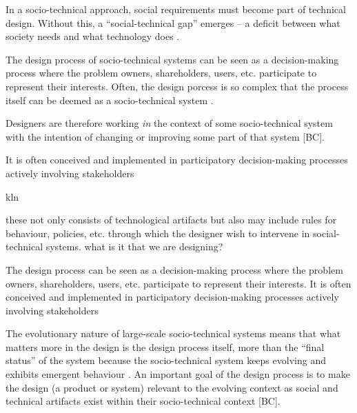 \begin{svgraybox}

In a socio-technical approach, social requirements must become part of technical design. Without this, a ``social-technical  gap''  emerges -- a  deficit  between  what  society  needs  and  what technology does \cite{Whitworth2014}. 



 The design process of socio-technical systems can be seen as a decision-making process where the problem owners, shareholders, users, etc. participate to represent their interests. Often, the design porcess is so complex that the process itself can be deemed as a socio-technical system \cite{Baxter2011}. 



Designers are therefore working \textit{in} the context of some socio-technical system with the intention of changing or improving some part of that system [BC]. 

It is often conceived and implemented in participatory decision-making processes actively involving stakeholders

kln





 these not only consists of technological artifacts but also may include rules for behaviour, policies, etc. through which the designer wish to intervene in social-technical systems. what is it that we are designing? 

 The design process can be seen as a decision-making process where the problem owners, shareholders, users, etc. participate to represent their interests. It is often conceived and implemented in participatory decision-making processes actively involving stakeholders



The evolutionary nature of large-scale socio-technical systems means that what matters more in the design is the design process itself, more than the ``final status'' of the system \cite{Shin2014, need more ref} because the socio-technical system keeps evolving and exhibits emergent behaviour \cite{Nikolic2009}. An important  goal of the design process is to make the design (a product or system) relevant to the evolving context \cite{Shin2014, need more ref} as social and technical artifacts exist within their socio-technical context [BC]. 

\end{svgraybox}



